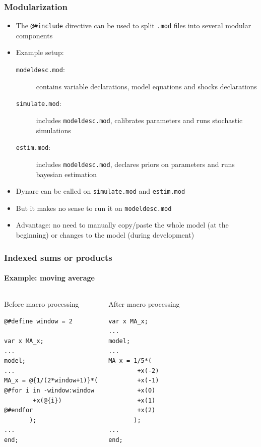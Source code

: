 \documentclass{beamer}
\begin{document}
\begin{frame}[fragile=singleslide]
  \frametitle{Modularization}
  \begin{itemize}
  \item The \verb+@#include+ directive can be used to split \texttt{.mod} files into several modular components
  \item Example setup:
    \begin{description}
    \item[\texttt{modeldesc.mod}:] contains variable declarations, model equations and shocks declarations
    \item[\texttt{simulate.mod}:] includes \texttt{modeldesc.mod}, calibrates parameters and runs stochastic simulations
    \item[\texttt{estim.mod}:] includes \texttt{modeldesc.mod}, declares priors on parameters and runs bayesian estimation
    \end{description}
  \item Dynare can be called on \texttt{simulate.mod} and \texttt{estim.mod}
  \item But it makes no sense to run it on \texttt{modeldesc.mod}
  \item Advantage: no need to manually copy/paste the whole model (at the beginning) or changes to the model (during development)
  \end{itemize}
\end{frame}

\begin{frame}[fragile=singleslide]
  \frametitle{Indexed sums or products}
  \framesubtitle{Example: moving average}
  \begin{columns}[T]
    \begin{block}{Before macro processing}
\begin{verbatim}
@#define window = 2

var x MA_x;
...
model;
...
MA_x = @{1/(2*window+1)}*(
@#for i in -window:window
        +x(@{i})
@#endfor
       );
...
end;
\end{verbatim}
    \end{block}
    \begin{block}{After macro processing}
\begin{verbatim}
var x MA_x;
...
model;
...
MA_x = 1/5*(
        +x(-2)
        +x(-1)
        +x(0)
        +x(1)
        +x(2)
       );
...
end;
\end{verbatim}
    \end{block}
  \end{columns}
\end{frame}
\end{document}
